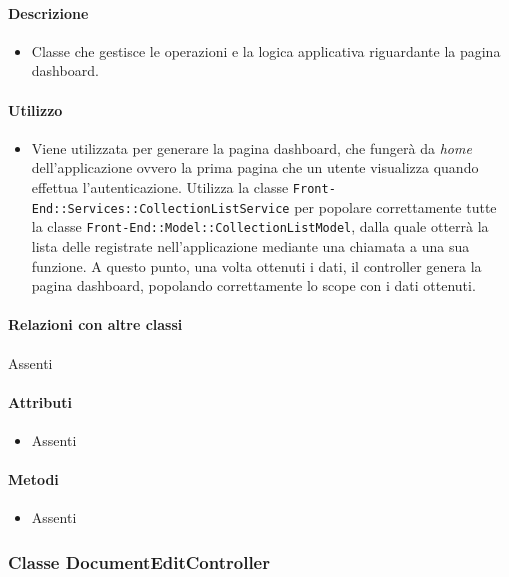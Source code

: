 \paragraph*{Descrizione}
\begin{itemize}
\item[] Classe che gestisce le operazioni e la logica applicativa riguardante la pagina dashboard.
\end{itemize}

\paragraph*{Utilizzo}
\begin{itemize}
\item[] Viene utilizzata per generare la pagina dashboard, che fungerà da \textit{home} dell'applicazione ovvero la prima pagina che un utente visualizza quando effettua l'autenticazione. Utilizza la classe \texttt{Front-End::Services::CollectionListService} per popolare correttamente tutte la classe \texttt{Front-End::Model::CollectionListModel}, dalla quale otterrà la lista delle  registrate nell'applicazione mediante una chiamata a una sua funzione. A questo punto, una volta ottenuti i dati, il controller genera la pagina dashboard, popolando correttamente lo scope con i dati ottenuti.
\end{itemize}

\paragraph*{Relazioni con altre classi}
Assenti

\paragraph*{Attributi}
\begin{itemize}
\item[] Assenti
\end{itemize}

\paragraph*{Metodi}
\begin{itemize}
\item[] Assenti
\end{itemize}

\subsubsection{Classe DocumentEditController}

